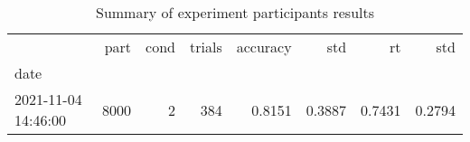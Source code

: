\begin{table}
\centering
\caption{Summary of experiment participants results}
\label{table-subject-summary}
\begin{tabular}{lrrrrrrr}
\toprule
{} &  part & cond & trials & accuracy &    std &     rt &    std \\
date                &       &      &        &          &        &        &        \\
\midrule
2021-11-04 14:46:00 &  8000 &    2 &    384 &   0.8151 & 0.3887 & 0.7431 & 0.2794 \\
\bottomrule
\end{tabular}
\end{table}
